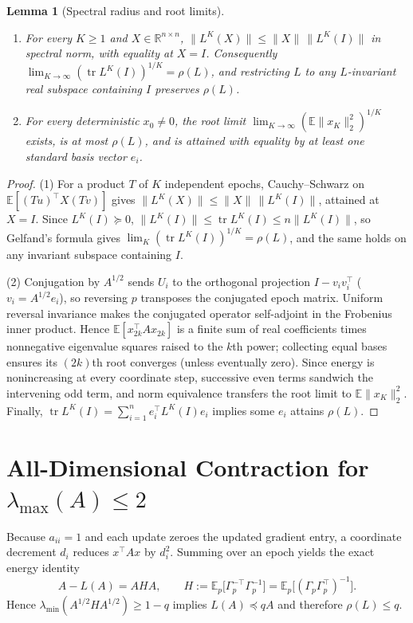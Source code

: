 \documentclass[11pt]{article}
\theoremstyle{plain}
\newtheorem{lemma}[theorem]{Lemma}
\theoremstyle{definition}
\theoremstyle{remark}
\DeclareMathOperator{\tr}{tr}
\begin{document}
\begin{lemma}[Spectral radius and root limits]\label{lem:spectral}
\begin{enumerate}[label=\textup{(\arabic*)}]
\item For every $K \ge 1$ and $X \in \mathbb{R}^{n \times n}$, $\|L^K(X)\| \le \|X\|\,\|L^K(I)\|$ in spectral norm, with equality at $X = I$. Consequently $\lim_{K \to \infty}(\tr L^K(I))^{1/K} = \rho(L)$, and restricting $L$ to any $L$-invariant real subspace containing $I$ preserves $\rho(L)$.
\item For every deterministic $x_0 \neq 0$, the root limit $\lim_{K \to \infty}(\mathbb{E}\|x_K\|_2^2)^{1/K}$ exists, is at most $\rho(L)$, and is attained with equality by at least one standard basis vector $e_i$.
\end{enumerate}
\end{lemma}

\begin{proof}
(1) For a product $T$ of $K$ independent epochs, Cauchy--Schwarz on $\mathbb{E}[(Tu)^\top X(Tv)]$ gives $\|L^K(X)\| \le \|X\|\,\|L^K(I)\|$, attained at $X = I$.
Since $L^K(I) \succeq 0$, $\|L^K(I)\| \le \tr L^K(I) \le n\|L^K(I)\|$, so Gelfand's formula gives $\lim_K (\tr L^K(I))^{1/K} = \rho(L)$, and the same holds on any invariant subspace containing $I$.

(2) Conjugation by $A^{1/2}$ sends $U_i$ to the orthogonal projection $I - v_i v_i^\top$ ($v_i = A^{1/2} e_i$), so reversing $p$ transposes the conjugated epoch matrix.
Uniform reversal invariance makes the conjugated operator self-adjoint in the Frobenius inner product.
Hence $\mathbb{E}[x_{2k}^\top A x_{2k}]$ is a finite sum of real coefficients times nonnegative eigenvalue squares raised to the $k$th power; collecting equal bases ensures its $(2k)$th root converges (unless eventually zero).
Since energy is nonincreasing at every coordinate step, successive even terms sandwich the intervening odd term, and norm equivalence transfers the root limit to $\mathbb{E}\|x_K\|_2^2$.
Finally, $\tr L^K(I) = \sum_{i=1}^n e_i^\top L^K(I) e_i$ implies some $e_i$ attains $\rho(L)$.
\end{proof}

\section{All-Dimensional Contraction for \texorpdfstring{$\lambda_{\max}(A) \le 2$}{lambda\_max(A) <= 2}}

Because $a_{ii} = 1$ and each update zeroes the updated gradient entry, a coordinate decrement $d_i$ reduces $x^\top A x$ by $d_i^2$.
Summing over an epoch yields the exact energy identity
\begin{equation}\label{eq:energy}
A - L(A) = A H A, \qquad H := \mathbb{E}_p\bigl[\Gamma_p^{-\top}\Gamma_p^{-1}\bigr] = \mathbb{E}_p\bigl[(\Gamma_p \Gamma_p^\top)^{-1}\bigr].
\end{equation}
Hence $\lambda_{\min}(A^{1/2} H A^{1/2}) \ge 1 - q$ implies $L(A) \preceq q A$ and therefore $\rho(L) \le q$.
\end{document}
